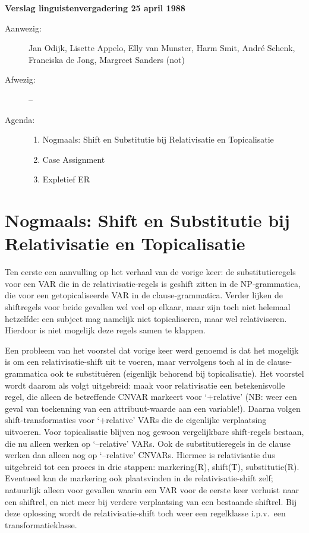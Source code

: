 \newpage
\noindent
{\bf Verslag linguistenvergadering 25 april 1988}
\begin{description}
\item[Aanwezig:] Jan Odijk, Lisette Appelo, Elly van Munster, Harm Smit, 
Andr\'{e} Schenk, Franciska de Jong, Margreet Sanders (not)
\item[Afwezig:] --
\item[Agenda:] \mbox{}
\begin{enumerate}
\item Nogmaals: Shift en Substitutie bij Relativisatie en Topicalisatie
\item Case Assignment
\item Expletief ER
\end{enumerate}
\end{description}

\setcounter{section}{0}
\section{Nogmaals: Shift en Substitutie bij Relativisatie en Topicalisatie}
Ten eerste een aanvulling op het verhaal van de vorige keer: de 
substitutieregels voor een VAR die in de relativisatie-regels is geshift zitten 
in de NP-grammatica, die voor een getopicaliseerde VAR in de clause-grammatica. 
Verder lijken de shiftregels voor beide gevallen wel veel op elkaar, maar zijn 
toch niet helemaal hetzelfde: een subject mag namelijk niet topicaliseren, maar 
wel relativiseren. Hierdoor is niet mogelijk deze regels samen te klappen.

Een probleem van het voorstel dat vorige keer werd genoemd is dat het mogelijk 
is om een relativisatie-shift uit te voeren, maar vervolgens toch al in de 
clause-grammatica ook te substitu\"{e}ren (eigenlijk behorend bij 
topicalisatie). Het voor\-stel wordt daarom als volgt uitgebreid: maak voor 
relativisatie een betekenisvolle regel, die alleen de betreffende CNVAR 
markeert voor `+relative' (NB: weer een geval van toekenning van een 
attribuut-waarde aan een variable!). Daarna volgen shift-transformaties voor 
`+relative' 
VARs die de eigenlijke verplaatsing uitvoeren. Voor topicalisatie blijven nog 
gewoon vergelijkbare shift-regels bestaan, die nu alleen werken op `--relative' 
VARs. Ook de substitutieregels in de clause werken dan alleen nog op 
`--relative' CNVARs. Hiermee is relativisatie dus uitgebreid tot een proces in 
drie stappen: markering(R), shift(T), substitutie(R). Eventueel kan de 
markering ook 
plaatsvinden in de relativisatie-shift zelf; natuurlijk alleen voor gevallen 
waarin een VAR voor de eerste keer verhuist naar een shiftrel, en niet meer bij 
verdere verplaatsing van een bestaande shiftrel. Bij deze oplossing wordt de 
relativisatie-shift toch weer een regelklasse i.p.v.\ een transformatieklasse.

